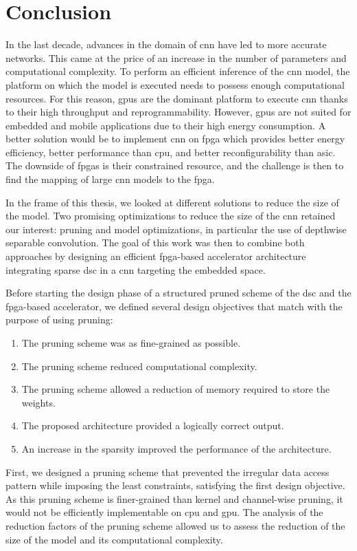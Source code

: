 \chapter*{Conclusion}
%
In the last decade, advances in the domain of \acrshort{cnn} have led to more accurate networks. This came at the price of an increase in the number of parameters and computational complexity. To perform an efficient inference of the \acrshort{cnn} model, the platform on which the model is executed needs to possess enough computational resources. For this reason, \acrshort{gpu}s are the dominant platform to execute \acrshort{cnn} thanks to their high throughput and reprogrammability. However, \acrshort{gpu}s are not suited for embedded and mobile applications due to their high energy consumption. A better solution would be to implement \acrshort{cnn} on \acrshort{fpga} which provides better energy efficiency, better performance than \acrshort{cpu}, and better reconfigurability than \acrshort{asic}. The downside of \acrshort{fpga}s is their constrained resource, and the challenge is then to find the mapping of large \acrshort{cnn} models to the \acrshort{fpga}.

In the frame of this thesis, we looked at different solutions to reduce the size of the model. Two promising optimizations to reduce the size of the \acrshort{cnn} retained our interest: pruning and model optimizations, in particular the use of depthwise separable convolution. The goal of this work was then to combine both approaches by designing an efficient \acrshort{fpga}-based accelerator architecture integrating sparse \acrshort{dsc} in a \acrshort{cnn} targeting the embedded space.

Before starting the design phase of a structured pruned scheme of the \acrshort{dsc} and the \acrshort{fpga}-based accelerator, we defined several design objectives that match with the purpose of using pruning:
%
\begin{enumerate}
    \item The pruning scheme was as fine-grained as possible.
    \item The pruning scheme reduced computational complexity.
    \item The pruning scheme allowed a reduction of memory required to store the weights.
    \item The proposed architecture provided a logically correct output.
    \item An increase in the sparsity improved the performance of the architecture.
\end{enumerate}
%
First, we designed a pruning scheme that prevented the irregular data access pattern while imposing the least constraints, satisfying the first design objective. As this pruning scheme is finer-grained than kernel and channel-wise pruning, it would not be efficiently implementable on \acrshort{cpu} and \acrshort{gpu}. The analysis of the reduction factors of the pruning scheme allowed us to assess the reduction of the size of the model and its computational complexity.

